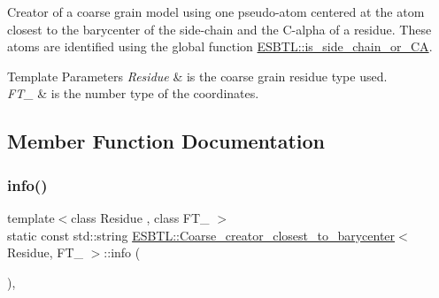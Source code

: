 Creator of a coarse grain model using one pseudo-\/atom centered at the atom closest to the barycenter of the side-\/chain and the C-\/alpha of a residue. These atoms are identified using the global function \hyperlink{namespaceESBTL_a117981ffccc18137b919af5c47a51b0d}{E\+S\+B\+T\+L\+::is\+\_\+side\+\_\+chain\+\_\+or\+\_\+\+CA}.


\begin{DoxyTemplParams}{Template Parameters}
{\em Residue} & is the coarse grain residue type used. \\
\hline
{\em F\+T\+\_\+} & is the number type of the coordinates. \\
\hline
\end{DoxyTemplParams}


\subsection{Member Function Documentation}
\mbox{\label{classESBTL_1_1Coarse__creator__closest__to__barycenter_a22f90422bb755d78f11b3f34094de0b2}} 
\subsubsection{\texorpdfstring{info()}{info()}}
{\footnotesize\ttfamily template$<$class Residue , class F\+T\+\_\+ $>$ \\
static const std\+::string \hyperlink{classESBTL_1_1Coarse__creator__closest__to__barycenter}{E\+S\+B\+T\+L\+::\+Coarse\+\_\+creator\+\_\+closest\+\_\+to\+\_\+barycenter}$<$ Residue, F\+T\+\_\+ $>$\+::info (\begin{DoxyParamCaption}{ }\end{DoxyParamCaption})\hspace{0.3cm}{\ttfamily [inline]}, {\ttfamily [static]}}

\mbox{\label{classESBTL_1_1Coarse__creator__closest__to__barycenter_aa6921d3c94810e7564188b837cf40191}} 
